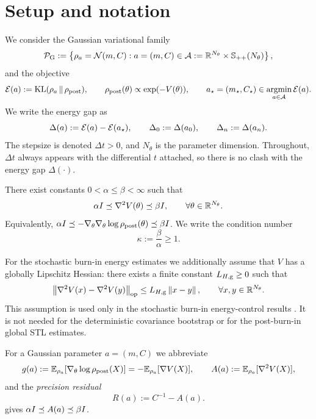 \section{Setup and notation}
\label{sec:note-setup}

We consider the Gaussian variational family
\[
    \mathcal{P}_{\mathrm G}
    :=
    \left\{
        \rho_a=\mathcal{N}(m,C):
        a=(m,C)\in\mathcal{A}:=\mathbb{R}^{N_\theta}\times\mathbb{S}_{++}(N_\theta)
    \right\},
\]
and the objective
\[
    \mathcal{E}(a)
    :=
    \mathrm{KL}(\rho_a\,\|\,\rho_{\mathrm{post}}),
    \qquad
    \rho_{\mathrm{post}}(\theta)\propto \exp(-V(\theta)),
    \qquad
    a_\star=(m_\star,C_\star)
    \in
    \operatorname*{argmin}_{a\in\mathcal{A}}\mathcal{E}(a).
\]
We write the energy gap as
\[
    \Delta(a):=\mathcal{E}(a)-\mathcal{E}(a_\star),
    \qquad
    \Delta_0:=\Delta(a_0),
    \qquad
    \Delta_n:=\Delta(a_n).
\]
The stepsize is denoted $\Delta t>0$, and $N_\theta$ is the parameter dimension. Throughout,
$\Delta t$ always appears with the differential $t$ attached, so there is no clash with the
energy gap $\Delta(\cdot)$.

\begin{assumption}
\label{assump:logconcave-smooth}
There exist constants $0<\alpha\leq \beta<\infty$ such that
\[
    \alpha I
    \preceq
    \nabla^2V(\theta)
    \preceq
    \beta I,
    \qquad
    \forall \theta\in\mathbb{R}^{N_\theta}.
\]
Equivalently, $\alpha I\preceq -\nabla_\theta\nabla_\theta\log\rho_{\mathrm{post}}(\theta)\preceq\beta I$.
We write the condition number
\[
    \kappa:=\frac{\beta}{\alpha}\geq 1.
\]
\end{assumption}

\begin{assumption}
\label{assump:global-Hess-Lip}
For the stochastic burn-in energy estimates we additionally assume that $V$ has a
globally Lipschitz Hessian: there exists a finite constant $L_{H,\mathrm g}\geq0$ such that
\[
    \left\lVert \nabla^2V(x)-\nabla^2V(y)\right\rVert_{\mathrm{op}}
    \leq
    L_{H,\mathrm g}\left\lVert x-y\right\rVert,
    \qquad
    \forall x,y\in\mathbb{R}^{N_\theta}.
\]
This assumption is used only in the stochastic burn-in energy-control results
.
It is not needed for the deterministic covariance bootstrap or for the post-burn-in
global STL estimates.
\end{assumption}

For a Gaussian parameter $a=(m,C)$ we abbreviate
\[
    g(a):=\mathbb{E}_{\rho_a}[\nabla_\theta\log\rho_{\mathrm{post}}(X)]
    =-\mathbb{E}_{\rho_a}[\nabla V(X)],
    \qquad
    A(a):=\mathbb{E}_{\rho_a}[\nabla^2V(X)],
\]
and the \emph{precision residual}
\[
    R(a):=C^{-1}-A(a).
\]
 gives $\alpha I\preceq A(a)\preceq\beta I$.

